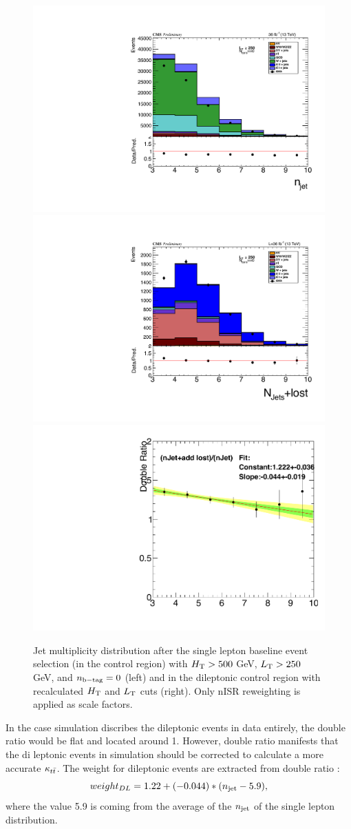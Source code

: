 \begin{figure}[!hbt]
    \begin{center}
 \includegraphics[width=0.4 \textwidth]{Plots/analysis/RCS/diLepCR/singLep}
 \includegraphics[width=0.4 \textwidth]{Plots/analysis/RCS/diLepCR/diLep}\\
    \includegraphics[width=0.4 \textwidth]{Plots/analysis/RCS/diLepCR/double_Ratio}
  \caption{ \label{dl-CR} Jet multiplicity distribution after the single lepton baseline event selection (in the control region)
 with $H_{\rm T}>500$ GeV, $L_{\rm T}>250$ GeV, and $n_{\rm b-tag} = 0$ (left) and in the dileptonic control region with recalculated $H_{\rm T}$ and $L_{\rm T}$ cuts (right). Only nISR reweighting is applied as scale factors. }
  \end{center}
\end{figure}
In the case simulation discribes the dileptonic events in data entirely, the double ratio would be flat and located around 1.
However, double ratio manifests that the di leptonic events in simulation should be corrected to calculate a more accurate $\kappa_{t\bar{t}}$.
The weight for dileptonic events are extracted from double ratio : 
\begin{equation}
\label{weight_DL}
weight_{DL} = 1.22+(-0.044)*(n_{\rm jet} - 5.9),
\end{equation}
where the value 5.9 is coming from the average of the $n_{\rm jet}$ of the single lepton distribution.
